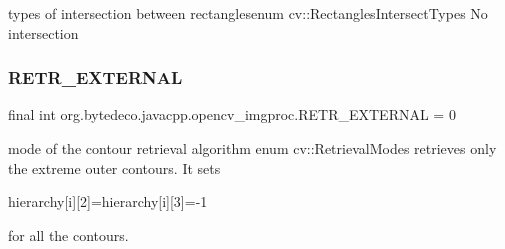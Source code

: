 types of intersection between rectanglesenum cv\+::\+Rectangles\+Intersect\+Types No intersection \mbox{\label{group__imgproc__shape_ga94d7307a24949485303f94d555fd31c8}} 
\subsubsection{\texorpdfstring{R\+E\+T\+R\+\_\+\+E\+X\+T\+E\+R\+N\+AL}{RETR\_EXTERNAL}}
{\footnotesize\ttfamily final int org.\+bytedeco.\+javacpp.\+opencv\+\_\+imgproc.\+R\+E\+T\+R\+\_\+\+E\+X\+T\+E\+R\+N\+AL = 0\hspace{0.3cm}{\ttfamily [static]}}

mode of the contour retrieval algorithm enum cv\+::\+Retrieval\+Modes retrieves only the extreme outer contours. It sets
\begin{DoxyCode}
hierarchy[i][2]=hierarchy[i][3]=-1 
\end{DoxyCode}
 for all the contours. 